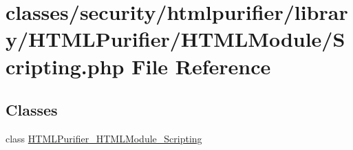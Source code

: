 \hypertarget{Scripting_8php}{\section{classes/security/htmlpurifier/library/\+H\+T\+M\+L\+Purifier/\+H\+T\+M\+L\+Module/\+Scripting.php File Reference}
\label{Scripting_8php}
}
\subsection*{Classes}
\begin{DoxyCompactItemize}
\item 
class \hyperlink{classHTMLPurifier__HTMLModule__Scripting}{H\+T\+M\+L\+Purifier\+\_\+\+H\+T\+M\+L\+Module\+\_\+\+Scripting}
\end{DoxyCompactItemize}
